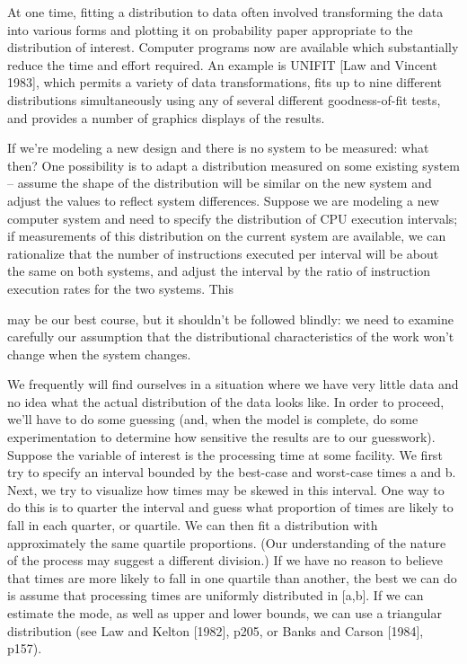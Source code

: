 At one time, fitting a distribution to data often involved transforming the
data into various forms and plotting it on probability paper appropriate to the
distribution of interest. Computer programs now are available which
substantially reduce the time and effort required. An example is UNIFIT [Law
and Vincent 1983], which permits a variety of data transformations, fits up to
nine different distributions simultaneously using any of several different
goodness-of-fit tests, and provides a number of graphics displays of the
results.

If we're modeling a new design and there is no system to be measured:
what then? One possibility is to adapt a distribution measured on some existing
system -- assume the shape of the distribution will be similar on the new
system and adjust the values to reflect system differences. Suppose we are
modeling a new computer system and need to specify the distribution of CPU
execution intervals; if measurements of this distribution on the current system
are available, we can rationalize that the number of instructions executed per
interval will be about the same on both systems, and adjust the interval by the
ratio of instruction execution rates for the two systems. This

\noindent may be our best course, but it shouldn't be followed blindly: we need to
examine carefully our assumption that the distributional characteristics of
the work won't change when the system changes.

We frequently will find ourselves in a situation where we have very little data
and no idea what the actual distribution of the data looks like. In order to
proceed, we'll have to do some guessing (and, when the model is complete, do
some experimentation to determine how sensitive the results are to our
guesswork). Suppose the variable of interest is the processing time at some
facility. We first try to specify an interval bounded by the best-case and
worst-case times a and b. Next, we try to visualize how times may be skewed in
this interval. One way to do this is to quarter the interval and guess what
proportion of times are likely to fall in each quarter, or quartile. We can
then fit a distribution with approximately the same quartile proportions. (Our
understanding of the nature of the process may suggest a different division.)
If we have no reason to believe that times are more likely to fall in one
quartile than another, the best we can do is assume that processing times are
uniformly distributed in [a,b]. If we can estimate the mode, as well as upper
and lower bounds, we can use a triangular distribution (see Law and Kelton
[1982], p205, or Banks and Carson [1984], p157).

